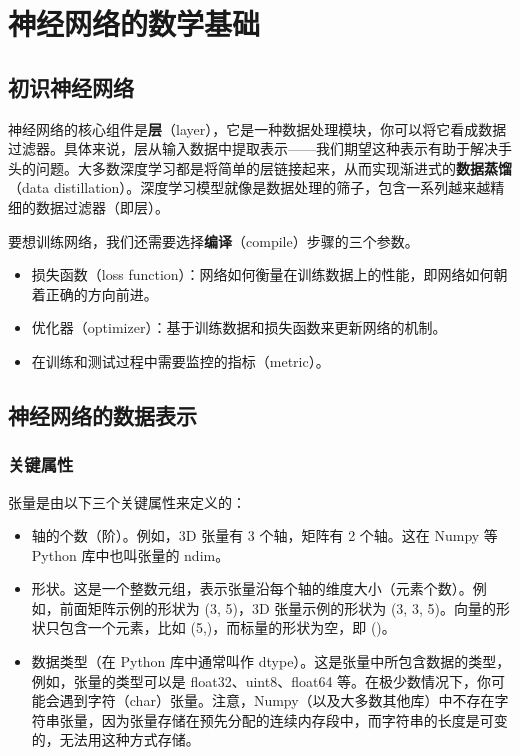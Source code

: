 \chapter{神经网络的数学基础\label{Ch02}}
\section{初识神经网络}
神经网络的核心组件是\textbf{层}（layer），它是一种数据处理模块，你可以将它看成数据过滤器。具体来说，层从输入数据中提取表示——我们期望这种表示有助于解决手头的问题。大多数深度学习都是将简单的层链接起来，从而实现渐进式的\textbf{数据蒸馏}（data distillation）。深度学习模型就像是数据处理的筛子，包含一系列越来越精细的数据过滤器（即层）。

要想训练网络，我们还需要选择\textbf{编译}（compile）步骤的三个参数。
\begin{itemize}
    \item 损失函数（loss function）：网络如何衡量在训练数据上的性能，即网络如何朝着正确的方向前进。
    \item 优化器（optimizer）：基于训练数据和损失函数来更新网络的机制。
    \item 在训练和测试过程中需要监控的指标（metric）。
\end{itemize}

\section{神经网络的数据表示}
\subsection{关键属性}

张量是由以下三个关键属性来定义的：
\begin{itemize}
    \item 轴的个数（阶）。例如，3D 张量有 3 个轴，矩阵有 2 个轴。这在 Numpy 等 Python 库中也叫张量的 ndim。
    \item 形状。这是一个整数元组，表示张量沿每个轴的维度大小（元素个数）。例如，前面矩阵示例的形状为 (3, 5)，3D 张量示例的形状为 (3, 3, 5)。向量的形状只包含一个元素，比如 (5,)，而标量的形状为空，即 ()。
    \item 数据类型（在 Python 库中通常叫作 dtype）。这是张量中所包含数据的类型，例如，张量的类型可以是 float32、uint8、float64 等。在极少数情况下，你可能会遇到字符（char）张量。注意，Numpy（以及大多数其他库）中不存在字符串张量，因为张量存储在预先分配的连续内存段中，而字符串的长度是可变的，无法用这种方式存储。
\end{itemize}

